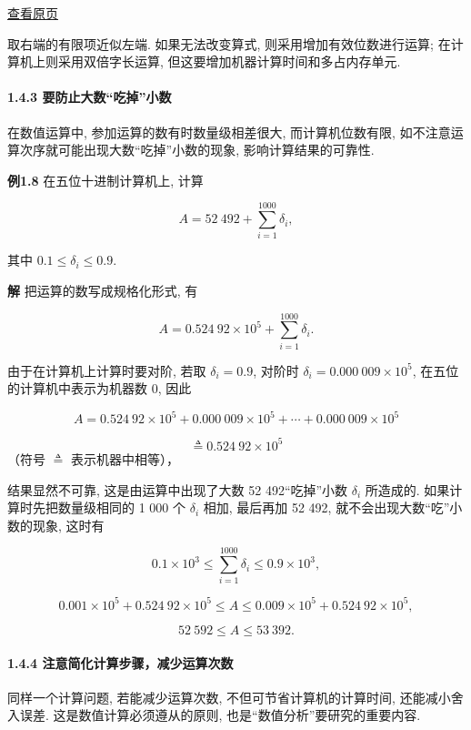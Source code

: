 \documentclass[
  10pt,
  fontset=fandol]{ctexart}
\begin{document}
\href{../../source-images/pdf-024.jpeg}{查看原页}

取右端的有限项近似左端. 如果无法改变算式, 则采用增加有效位数进行运算; 在计算机上则采用双倍字长运算, 但这要增加机器计算时间和多占内存单元.

\paragraph{1.4.3 要防止大数``吃掉''小数}\label{ux8981ux9632ux6b62ux5927ux6570ux5403ux6389ux5c0fux6570}

在数值运算中, 参加运算的数有时数量级相差很大, 而计算机位数有限, 如不注意运算次序就可能出现大数``吃掉''小数的现象, 影响计算结果的可靠性.

\textbf{例1.8} 在五位十进制计算机上, 计算

\[
A = 52\ 492 + \sum_{i=1}^{1000} \delta_i,
\]

其中 \(0.1 \leqslant \delta_i \leqslant 0.9\).

\textbf{解} 把运算的数写成规格化形式, 有

\[
A = 0.524\ 92 \times 10^5 + \sum_{i=1}^{1000} \delta_i.
\]

由于在计算机上计算时要对阶, 若取 \(\delta_i = 0.9\), 对阶时 \(\delta_i = 0.000\ 009 \times 10^5\), 在五位的计算机中表示为机器数 0, 因此

\[
A = 0.524\ 92 \times 10^5 + 0.000\ 009 \times 10^5 + \cdots + 0.000\ 009 \times 10^5
\]

\[
\triangleq 0.524\ 92 \times 10^5
\] （符号 \(\triangleq\) 表示机器中相等），

结果显然不可靠, 这是由运算中出现了大数 52 492``吃掉''小数 \(\delta_i\) 所造成的. 如果计算时先把数量级相同的 1 000 个 \(\delta_i\) 相加, 最后再加 52 492, 就不会出现大数``吃''小数的现象, 这时有

\[
0.1 \times 10^3 \leqslant \sum_{i=1}^{1000} \delta_i \leqslant 0.9 \times 10^3,
\]

\[
0.001 \times 10^5 + 0.524\ 92 \times 10^5 \leqslant A \leqslant 0.009 \times 10^5 + 0.524\ 92 \times 10^5,
\]

\[
52\ 592 \leqslant A \leqslant 53\ 392.
\]

\paragraph{1.4.4 注意简化计算步骤，减少运算次数}\label{ux6ce8ux610fux7b80ux5316ux8ba1ux7b97ux6b65ux9aa4ux51cfux5c11ux8fd0ux7b97ux6b21ux6570}

同样一个计算问题, 若能减少运算次数, 不但可节省计算机的计算时间, 还能减小舍入误差. 这是数值计算必须遵从的原则, 也是``数值分析''要研究的重要内容.
\end{document}

